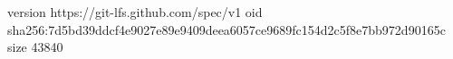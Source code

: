 version https://git-lfs.github.com/spec/v1
oid sha256:7d5bd39ddcf4e9027e89e9409deea6057ce9689fc154d2c5f8e7bb972d90165c
size 43840
